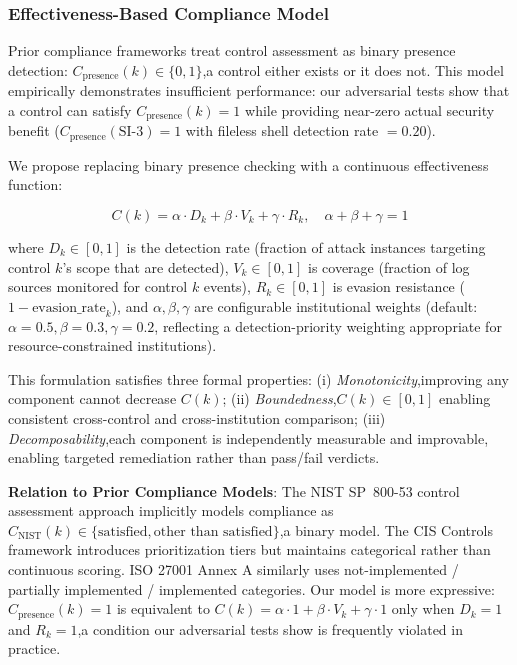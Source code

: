 \documentclass[futureinternet,article,submit,pdftex,moreauthors]{Definitions/mdpi}
\begin{document}
\subsubsection{Effectiveness-Based Compliance Model}

Prior compliance frameworks treat control assessment as binary presence detection:
$C_{\text{presence}}(k) \in \{0, 1\}$,a control either exists or it does not. This model
empirically demonstrates insufficient performance: our adversarial tests show that a control can satisfy
$C_{\text{presence}}(k) = 1$ while providing near-zero actual security benefit
($C_{\text{presence}}(\text{SI-3}) = 1$ with fileless shell detection rate $= 0.20$).

We propose replacing binary presence checking with a continuous effectiveness function:
\begin{linenomath}
\begin{equation}
C(k) = \alpha \cdot D_k + \beta \cdot V_k + \gamma \cdot R_k, \quad \alpha + \beta + \gamma = 1
\label{eq:compliance}
\end{equation}
\end{linenomath}
where $D_k \in [0,1]$ is the detection rate (fraction of attack instances targeting control
$k$'s scope that are detected), $V_k \in [0,1]$ is coverage (fraction of log sources
monitored for control $k$ events), $R_k \in [0,1]$ is evasion resistance
($1 - \text{evasion\_rate}_k$), and $\alpha, \beta, \gamma$ are configurable institutional
weights (default: $\alpha = 0.5, \beta = 0.3, \gamma = 0.2$, reflecting a detection-priority
weighting appropriate for resource-constrained institutions).

This formulation satisfies three formal properties: (i) \textit{Monotonicity},improving any
component cannot decrease $C(k)$; (ii) \textit{Boundedness},$C(k) \in [0,1]$ enabling
consistent cross-control and cross-institution comparison; (iii) \textit{Decomposability},each
component is independently measurable and improvable, enabling targeted remediation rather
than pass/fail verdicts.

\textbf{Relation to Prior Compliance Models}: The NIST SP~800-53 control assessment approach
implicitly models compliance as $C_{\text{NIST}}(k) \in \{\text{satisfied}, \text{other than
satisfied}\}$,a binary model. The CIS Controls framework introduces prioritization tiers but
maintains categorical rather than continuous scoring. ISO 27001 Annex A similarly uses
not-implemented / partially implemented / implemented categories. Our model is more
expressive: $C_{\text{presence}}(k) = 1$ is equivalent to $C(k) = \alpha \cdot 1 + \beta \cdot
V_k + \gamma \cdot 1$ only when $D_k = 1$ and $R_k = 1$,a condition our adversarial tests
show is frequently violated in practice.
\end{document}
